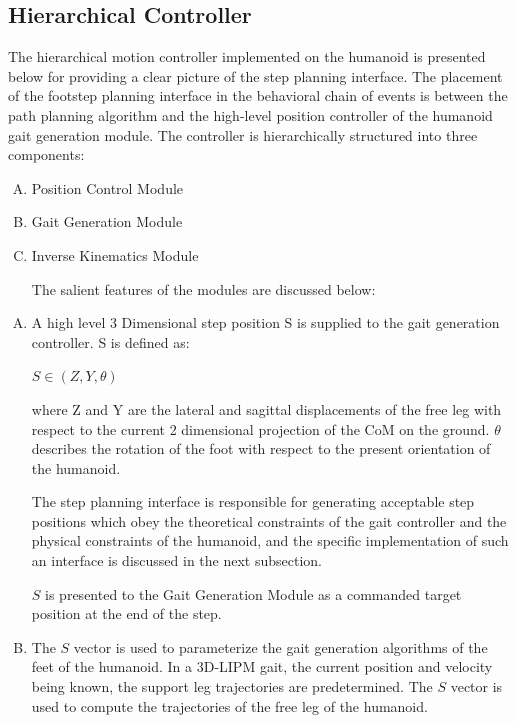 \documentclass[letterpaper, 10 pt, conference]{ieeeconf}  %
\begin{document}
\subsection{Hierarchical Controller}
The hierarchical motion controller implemented on the humanoid is presented below for providing a clear picture of the step planning interface. 
The placement of the footstep planning interface in the behavioral chain of
events is between the path planning algorithm and the high-level position
controller of the humanoid gait generation module. The
controller is hierarchically structured into three components:
	\begin{enumerate}[A)]
\item Position Control Module
\item Gait Generation Module
\item Inverse Kinematics Module

The salient features of the modules are discussed below:
\end{enumerate}
	\begin{enumerate}[A)]
  \item A high level 3 Dimensional step position S is
  supplied to the gait generation controller. S is defined as:
  	
  	\begin{center}$S \in (Z, Y, \theta)$\end{center}
 where Z and Y are the lateral and sagittal displacements of the
 free leg with respect to the current 2 dimensional projection of the CoM on
  the ground. $\theta$ describes the rotation of the foot with respect
  to the present orientation of the humanoid. 

The step planning interface is responsible for generating acceptable step positions which obey the theoretical constraints of the gait controller and the physical constraints of the humanoid, and the specific implementation of such an interface is discussed in the next subsection.
  	
  $S$ is presented to the Gait Generation Module as a commanded target position at the end of the step.
  \item The $S$ vector is used to parameterize the gait generation algorithms of the feet of the humanoid. In a 3D-LIPM gait, the current position and velocity being known, the support leg trajectories are predetermined. The $S$ vector is used to compute the trajectories of the free leg of the humanoid.
\end{enumerate}
\end{document}
